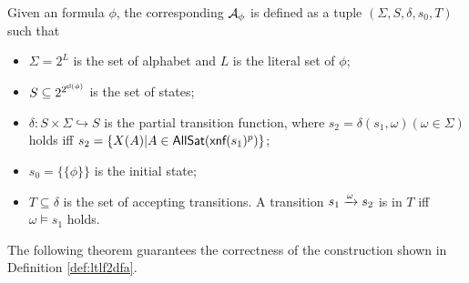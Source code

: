 \begin{definition}\label{def:ltlf2dfa}
Given an \ltlf formula $\phi$, the corresponding \TDFA ${\mathcal{A}_{\phi}}$ is defined as a tuple $(\Sigma, S, \delta, s_0, T)$ such that
\begin{itemize}
	\item $\Sigma = 2^{L}$ is the set of alphabet and $L$ is the literal set of $\phi$;
	\item $S\subseteq 2^{2^{{\sf cl}(\phi)}}$ is the set of states;
	\item $\delta:  S \times \Sigma \hookrightarrow S$ is the partial transition function, where $s_2 = \delta(s_1, \omega) (\omega \in \Sigma)$ holds iff $s_2=\{X(A) | A\in{\sf AllSat}(\textsf{xnf}(s_1)^p)\}$;
	\item $s_0 = \{\{\phi \}\}$ is the initial state;
	\item $T\subseteq \delta$ is the set of accepting transitions. A transition $s_1\xrightarrow[]{\omega}s_2$ is in $T$ iff $\omega\models s_1$ holds. 
\end{itemize}

\end{definition}

The following theorem guarantees the correctness of the \tdfa construction shown in Definition \ref{def:ltlf2dfa}. 

